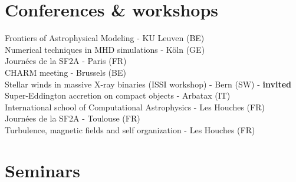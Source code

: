 \newpage

\section*{Conferences \& workshops}

\begin{flushleft}

\noindent{} Frontiers of Astrophysical Modeling - KU Leuven (BE)\\
\vspace*{0.1cm}
\noindent{} Numerical techniques in MHD simulations - K\"{o}ln (GE)\\
\vspace*{0.1cm}
\noindent{} Journ\'ees de la SF2A - Paris (FR)\\
\vspace*{0.1cm}
\noindent{} CHARM meeting - Brussels (BE)\\
\vspace*{0.1cm}
\noindent{} Stellar winds in massive X-ray binaries (ISSI workshop) - Bern (SW) - \textbf{invited}\\
\vspace*{0.1cm}
\noindent{} Super-Eddington accretion on compact objects - Arbatax (IT)\\
\vspace*{0.1cm}
\noindent{} International school of Computational Astrophysics - Les Houches (FR)\\
\vspace*{0.1cm}
\noindent{} Journ\'ees de la SF2A - Toulouse (FR)\\
\vspace*{0.1cm}
\noindent{} Turbulence, magnetic fields and self organization - Les Houches (FR)\\


\end{flushleft}

\section*{Seminars}

